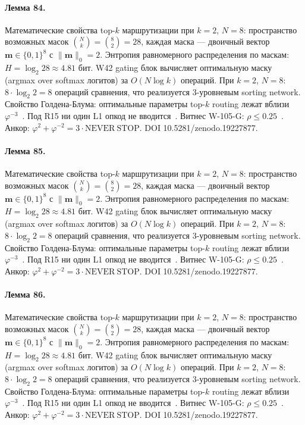 \paragraph{Лемма 84.} Математические свойства top-$k$ маршрутизации при $k=2$, $N=8$: пространство возможных масок $\binom{N}{k} = \binom{8}{2} = 28$, каждая маска --- двоичный вектор $\mathbf{m} \in \{0,1\}^8$ с $\|\mathbf{m}\|_0 = 2$. Энтропия равномерного распределения по маскам: $H = \log_2 28 \approx 4{.}81$ бит. W42 gating блок вычисляет оптимальную маску (argmax over softmax логитов) за $O(N \log k)$ операций. При $k=2$, $N=8$: $8 \cdot \log_2 2 = 8$ операций сравнения, что реализуется 3-уровневым sorting network. Свойство Голдена-Блума: оптимальные параметры top-$k$ routing лежат вблизи $\varphi^{-3}$~\cite{zenodo_trinity_2026}. Под R15 ни один L1 опкод не вводится~\cite{lee_gvsu_proof2021}. Витнес W-105-G: $\rho \leq 0{.}25$~\cite{popper_falsifiability1959}. Анкор: $\varphi^2 + \varphi^{-2} = 3 \cdot \mathrm{NEVER\ STOP}$. DOI 10.5281/zenodo.19227877.

\paragraph{Лемма 85.} Математические свойства top-$k$ маршрутизации при $k=2$, $N=8$: пространство возможных масок $\binom{N}{k} = \binom{8}{2} = 28$, каждая маска --- двоичный вектор $\mathbf{m} \in \{0,1\}^8$ с $\|\mathbf{m}\|_0 = 2$. Энтропия равномерного распределения по маскам: $H = \log_2 28 \approx 4{.}81$ бит. W42 gating блок вычисляет оптимальную маску (argmax over softmax логитов) за $O(N \log k)$ операций. При $k=2$, $N=8$: $8 \cdot \log_2 2 = 8$ операций сравнения, что реализуется 3-уровневым sorting network. Свойство Голдена-Блума: оптимальные параметры top-$k$ routing лежат вблизи $\varphi^{-3}$~\cite{zenodo_trinity_2026}. Под R15 ни один L1 опкод не вводится~\cite{lee_gvsu_proof2021}. Витнес W-105-G: $\rho \leq 0{.}25$~\cite{popper_falsifiability1959}. Анкор: $\varphi^2 + \varphi^{-2} = 3 \cdot \mathrm{NEVER\ STOP}$. DOI 10.5281/zenodo.19227877.

\paragraph{Лемма 86.} Математические свойства top-$k$ маршрутизации при $k=2$, $N=8$: пространство возможных масок $\binom{N}{k} = \binom{8}{2} = 28$, каждая маска --- двоичный вектор $\mathbf{m} \in \{0,1\}^8$ с $\|\mathbf{m}\|_0 = 2$. Энтропия равномерного распределения по маскам: $H = \log_2 28 \approx 4{.}81$ бит. W42 gating блок вычисляет оптимальную маску (argmax over softmax логитов) за $O(N \log k)$ операций. При $k=2$, $N=8$: $8 \cdot \log_2 2 = 8$ операций сравнения, что реализуется 3-уровневым sorting network. Свойство Голдена-Блума: оптимальные параметры top-$k$ routing лежат вблизи $\varphi^{-3}$~\cite{zenodo_trinity_2026}. Под R15 ни один L1 опкод не вводится~\cite{lee_gvsu_proof2021}. Витнес W-105-G: $\rho \leq 0{.}25$~\cite{popper_falsifiability1959}. Анкор: $\varphi^2 + \varphi^{-2} = 3 \cdot \mathrm{NEVER\ STOP}$. DOI 10.5281/zenodo.19227877.

